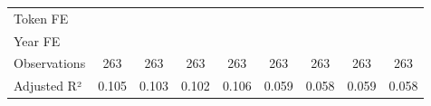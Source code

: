 {\begin{tabular}{l*{8}{c}}
\midrule
Token FE            &                     &                     &                     &                     &                     &                     &                     &                     \\
Year FE             &                     &                     &                     &                     &                     &                     &                     &                     \\
Observations        &         263         &         263         &         263         &         263         &         263         &         263         &         263         &         263         \\
Adjusted R²         &       0.105         &       0.103         &       0.102         &       0.106         &       0.059         &       0.058         &       0.059         &       0.058         \\
\bottomrule
\end{tabular}
}
